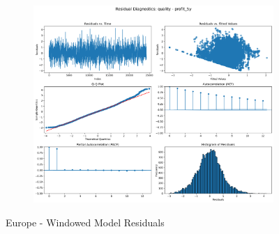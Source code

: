 \documentclass[11pt,english,a4paper,hidelinks]{book}
\begin{document}
\begin{figure}[H]
\begin{subfigure}[b]{0.32\textwidth}
    \end{subfigure}
    \hfill
    \begin{subfigure}[b]{0.32\textwidth}
        \centering
        \includegraphics[width=\textwidth]{images/code/models/linear_regression/third_model/EU/quality_profit_5y_residuals.png}
    \end{subfigure}
    \caption{Europe - Windowed Model Residuals}
    \label{fig:linear_regression_EU_residues_windowed}
\end{figure}
\end{document}
